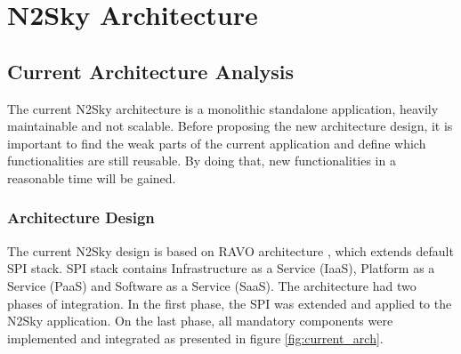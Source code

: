 \section{N2Sky Architecture}\label{TheN2SkyArchitecture}

\subsection{Current Architecture Analysis}\label{CurrentArchitectureAnalysis}

The current N2Sky architecture is a monolithic standalone application, heavily maintainable and not scalable. Before proposing the new architecture design, it is important to find the weak parts of the current application and define which functionalities are still reusable. By doing that, new functionalities in a reasonable time will be gained.

\subsubsection{Architecture Design}\label{Architecturedesign}

The current N2Sky design is based on RAVO architecture \cite{ravo}, which extends default SPI stack. SPI stack contains Infrastructure as a Service (IaaS), Platform as a Service (PaaS) and Software as a Service (SaaS). The architecture had two phases of integration. In the first phase, the SPI was extended and applied to the N2Sky application. On the last phase, all mandatory components were implemented and integrated as presented in figure \ref{fig:current_arch}.

